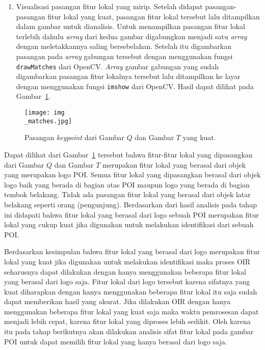 \begin{enumerate}
    \item Visualisasi pasangan fitur lokal yang mirip. Setelah didapat pasangan-pasangan fitur lokal yang kuat, pasangan fitur lokal tersebut lalu ditampilkan dalam gambar untuk dianalisis. Untuk menampilkan pasangan fitur lokal terlebih dahulu \textit{array} dari kedua gambar digabungkan menjadi satu \textit{array} dengan meletakkannya saling bersebelahan. Setelah itu digambarkan pasangan pada \textit{array} gabungan tersebut dengan menggunakan fungsi \texttt{drawMatches} dari OpenCV. \textit{Array} gambar gabungan yang sudah digambarkan pasangan fitur lokalnya tersebut lalu ditampilkan ke layar dengan menggunakan fungsi \texttt{imshow} dari OpenCV. Hasil dapat dilihat pada Gambar~\ref{fig:keypoint_matches}.
\end{enumerate}
\begin{figure}[H]
	\centering
	\texttt{[image: img\\\_matches.jpg]}
	\caption{Pasangan \textit{keypoint} dari Gambar $Q$ dan Gambar $T$ yang kuat.}
	\label{fig:keypoint_matches}
\end{figure}

Dapat dilihat dari Gambar~\ref{fig:keypoint_matches} tersebut bahwa fitur-fitur lokal yang dipasangkan dari Gambar $Q$ dan Gambar $T$ merupakan fitur lokal yang berasal dari objek yang merupakan logo POI. Semua fitur lokal yang dipasangkan berasal dari objek logo baik yang berada di bagian atas POI maupun logo yang berada di bagian tembok belakang. Tidak ada pasangan fitur lokal yang berasal dari objek latar belakang seperti orang (pengunjung). Berdasarkan dari hasil analisis pada tahap ini didapati bahwa fitur lokal yang berasal dari logo sebuah POI merupakan fitur lokal yang cukup kuat jika digunakan untuk melakukan identifikasi dari sebuah POI.

Berdasarkan kesimpulan bahwa fitur lokal yang berasal dari logo merupakan fitur lokal yang kuat jika digunakan untuk melakukan identifikasi maka proses OIR seharusnya dapat dilakukan dengan hanya menggunakan beberapa fitur lokal yang berasal dari logo saja. Fitur lokal dari logo tersebut karena sifatnya yang kuat diharapkan dengan hanya menggunakan beberapa fitur lokal itu saja sudah dapat memberikan hasil yang akurat. Jika dilakukan OIR dengan hanya menggunakan beberapa fitur lokal yang kuat saja maka waktu pemrosesan dapat menjadi lebih cepat, karena fitur lokal yang diproses lebih sedikit. Oleh karena itu pada tahap berikutnya akan dilakukan analisis sifat fitur lokal pada gambar POI untuk dapat memilih fitur lokal yang hanya berasal dari logo saja.

